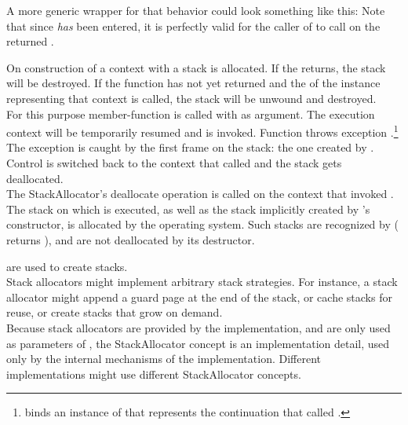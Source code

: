 A more generic wrapper for that behavior could look something like this:
Note that since  \emph{has} been entered, it
is perfectly valid for the caller of  to
call \resumewith on the returned \cont.

\label{subsec:destruction}
On construction of a context with \callcc a stack is allocated. If the
\entryfn returns, the stack will be destroyed. If the function has not
yet returned and the  of the \cont instance
representing that context is called, the stack will be unwound and destroyed.\\

For this purpose member-function \resumewith is called with \unwindcont
as argument. The execution context will be temporarily
resumed and \unwindcont is invoked. Function \unwindcont throws exception
\unwindex.\footnote{\unwindex binds an instance of \cont that represents the
continuation that called \resumewith.} The exception
is caught by the first frame on the stack: the one created by
\callcc. Control is switched back to the context that called
\dtor and the stack gets deallocated.\\

The StackAllocator's deallocate operation is called on the context that
invoked \dtor.\\

The stack on which  is executed, as well as the stack implicitly
created by 's constructor, is allocated by the operating
system. Such stacks are recognized by \cont (\anythread
returns ), and are not deallocated by its destructor.


\label{subsec:stackalloc}
are used to create stacks.\\

Stack allocators might implement arbitrary stack strategies. For instance, a
stack allocator might append a guard page at the end of the stack, or cache
stacks for reuse, or create stacks that grow on demand.\\

Because stack allocators are provided by the implementation, and are only used
as parameters of \callcc, the StackAllocator concept is an implementation detail,
used only by the internal mechanisms of the \cc implementation. Different
implementations might use different StackAllocator concepts.\\

